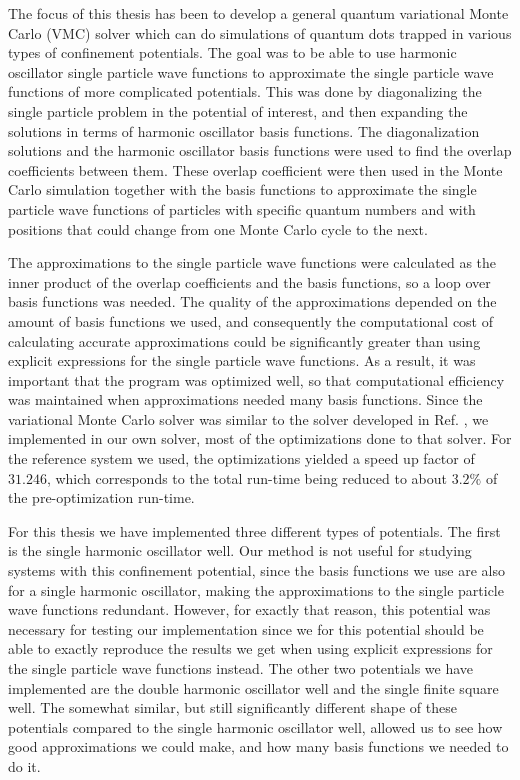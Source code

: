 \documentclass[../main.tex]{subfiles}
\begin{document}
The focus of this thesis has been to develop a general quantum variational Monte Carlo (VMC) solver which can do simulations of quantum dots trapped in various types of confinement potentials. The goal was to be able to use harmonic oscillator single particle wave functions to approximate the single particle wave functions of more complicated potentials. This was done by diagonalizing the single particle problem in the potential of interest, and then expanding the solutions in terms of harmonic oscillator basis functions. The diagonalization solutions and the harmonic oscillator basis functions were used to find the overlap coefficients between them. These overlap coefficient were then used in the Monte Carlo simulation together with the basis functions to approximate the single particle wave functions of particles with specific quantum numbers and with positions that could change from one Monte Carlo cycle to the next. 

The approximations to the single particle wave functions were calculated as the inner product of the overlap coefficients and the basis functions, so a loop over basis functions was needed. The quality of the approximations depended on the amount of basis functions we used, and consequently the computational cost of calculating accurate approximations could be significantly greater than using explicit expressions for the single particle wave functions. As a result, it was important that the program was optimized well, so that computational efficiency was maintained when approximations needed many basis functions. Since the variational Monte Carlo solver was similar to the solver developed in Ref. \cite{Jorgen}, we implemented in our own solver, most of the optimizations done to that solver. For the reference system we used, the optimizations yielded a speed up factor of $31.246$, which corresponds to the total run-time being reduced to about $3.2\%$ of the pre-optimization run-time.

For this thesis we have implemented three different types of potentials. The first is the single harmonic oscillator well. Our method is not useful for studying systems with this confinement potential, since the basis functions we use are also for a single harmonic oscillator, making the approximations to the single particle wave functions redundant. However, for exactly that reason, this potential was necessary for testing our implementation since we for this potential should be able to exactly reproduce the results we get when using explicit expressions for the single particle wave functions instead. The other two potentials we have implemented are the double harmonic oscillator well and the single finite square well. The somewhat similar, but still significantly different shape of these potentials compared to the single harmonic oscillator well, allowed us to see how good approximations we could make, and how many basis functions we needed to do it.
\end{document}
